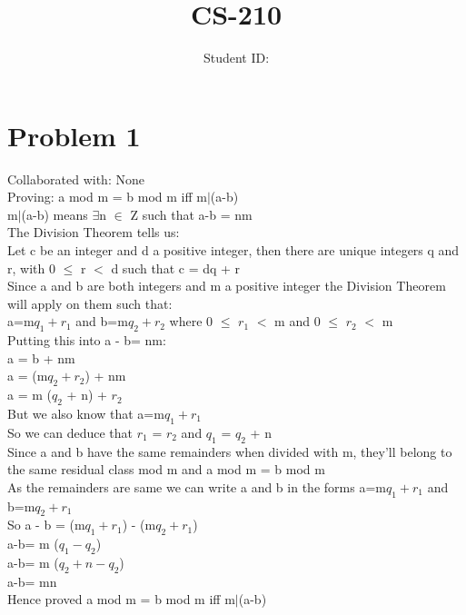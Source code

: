 \documentclass{article}
\title{CS-210 \hwNo}
\author{\myname \qquad Student ID: \myid}
\begin{document}
\maketitle

\section{Problem 1}
Collaborated with: None\\
Proving: a mod m = b mod m iff m$|$(a-b) \\
m$|$(a-b) means $\exists$n $\in$ Z such that a-b = nm\\
The Division Theorem tells us: \\
Let c be an integer and d a positive integer, then there are unique integers q and r, with 0 $\leq$ r $<$ d such that c = dq + r\\
Since a and b are both integers and m a positive integer the Division Theorem will apply on them such that: \\
a=m$q_{1} + r_{1}$ and b=m$q_{2} + r_{2}$ where  0 $\leq$ $r_{1}$ $<$ m and  0 $\leq$ $r_{2}$ $<$ m\\
Putting this into a - b= nm: \\
a = b + nm \\
a = (m$q_{2} + r_{2}$) + nm\\
a = m ($q_{2}$ + n) + $r_{2}$\\
But we also know that a=m$q_{1} + r_{1}$ \\
So we can deduce that $r_{1}$ = $r_{2}$ and $q_{1}$ = $q_{2}$ + n \\
Since a and b have the same remainders when divided with m, they'll belong to the same residual class mod m and a mod m = b mod m\\
As the remainders are same we can write a and b in the forms a=m$q_{1} + r_{1}$ and b=m$q_{2} + r_{1}$ \\
So a - b = (m$q_{1} + r_{1}$) - (m$q_{2} + r_{1}$)\\
a-b= m ($q_{1} - q_{2}$)\\
a-b= m ($q_{2} + n - q_{2}$)\\
a-b= mn\\
Hence proved a mod m = b mod m iff m$|$(a-b)
\end{document}
